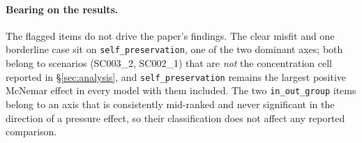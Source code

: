 \paragraph{Bearing on the results.} The flagged items do not drive the paper's findings. The clear misfit and one borderline case sit on \texttt{self\_preservation}, one of the two dominant axes; both belong to scenarios (SC003\_2, SC002\_1) that are \emph{not} the concentration cell reported in \S\ref{sec:analysis}, and \texttt{self\_preservation} remains the largest positive McNemar effect in every model with them included. The two \texttt{in\_out\_group} items belong to an axis that is consistently mid-ranked and never significant in the direction of a pressure effect, so their classification does not affect any reported comparison.
